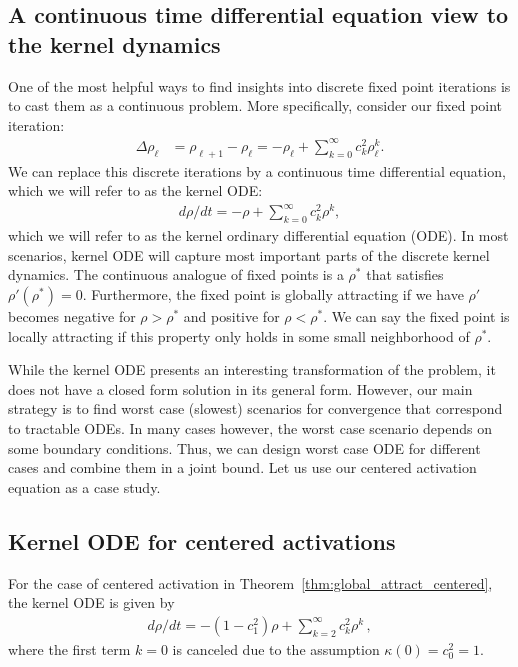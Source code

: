 \documentclass[twoside]{article}
\theoremstyle{definition}
\begin{document}
\subsection*{A continuous time differential equation view to the kernel dynamics} 
One of the most helpful ways to find insights into discrete fixed point iterations is to cast them as a continuous problem. More specifically, consider our fixed point iteration: 
\begin{align*}
    \Delta \rho_\ell &= \rho_{\ell+1} - \rho_\ell = - \rho_\ell + \sum_{k=0}^\infty c_k^2 \rho^k_\ell.
\end{align*}
We can replace this discrete iterations by a continuous time differential equation, which we will refer to as the kernel ODE:
\begin{align}\tag{kernel ODE}\label{eq:kernel_ODE}
    d\rho/dt = -\rho + \sum_{k=0}^\infty c_k^2 \rho^k,
\end{align}
which we will refer to as the kernel ordinary differential equation (ODE). In most scenarios, kernel ODE will capture most important parts of the discrete kernel dynamics.  The continuous analogue of fixed points is a $\rho^*$ that satisfies $\rho'(\rho^*) = 0.$ Furthermore, the fixed point is globally attracting if we have $\rho'$ becomes negative for $\rho>\rho^*$ and positive for $\rho<\rho^*.$ We can say the fixed point is locally attracting if this property only holds in some small neighborhood of $\rho^*.$

While the kernel ODE presents an interesting transformation of the problem, it does not have a closed form solution in its general form. However, our main strategy is to find worst case (slowest) scenarios for convergence that correspond to tractable ODEs. In many cases however, the worst case scenario depends on some boundary conditions. Thus, we can design worst case ODE for different cases and combine them in a joint bound. Let us use our centered activation equation as a case study. 

\subsection*{Kernel ODE for centered activations}
For the case of centered activation in Theorem~\ref{thm:global_attract_centered}, the kernel ODE is given by
\begin{align*}
    d\rho/dt = -(1-c_1^2)\rho + \sum_{k=2}^\infty c_k^2\rho^k\,,
\end{align*}
where the first term $k=0$ is canceled due to the assumption $\kappa(0)=c_0^2 = 1.$ 
\end{document}
